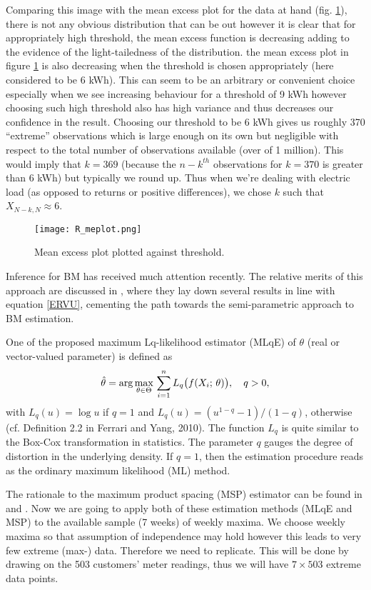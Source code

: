 Comparing this image with the mean excess plot for the data at hand (fig. \ref{fig:r_me}), there is not any obvious distribution that can be out however it is clear that for appropriately high threshold, the mean excess function is decreasing adding to the evidence of the light-tailedness of the distribution. the mean excess plot in figure \ref{fig:r_me} is also decreasing when the threshold is chosen appropriately (here considered to be 6 kWh). This can seem to be an arbitrary or convenient choice especially when we see increasing behaviour for a threshold of 9 kWh however choosing such high threshold also has high variance and thus decreases our confidence in the result. Choosing our threshold to be 6 kWh gives us roughly 370 ``extreme'' observations which is large enough on its own but negligible with respect to the total number of observations available (over of 1 million). This would imply that $k=369$ (because the $n-k^{th}$ observations for $k=370$ is greater than 6 kWh) but typically we round up. Thus when we're dealing with electric load (as opposed to returns or positive differences), we chose $k$ such that $X_{N-k,N} \approx 6$.

\begin{figure}
\centering
\texttt{[image: R\_meplot.png]}
\caption{\label{fig:r_me} Mean excess plot plotted against threshold.}
\end{figure}


Inference for BM has received much attention recently. The relative merits of this approach are discussed in \cite{FdeH:15}, where they lay down several results in line with equation \ref{ERVU}, cementing the path towards the semi-parametric approach to BM estimation.

One of the proposed maximum Lq-likelihood estimator (MLqE) of $\theta$ (real or vector-valued parameter) is defined as
\begin{equation*}
	\hat{\theta}= \displaystyle {\arg\max_{\theta \in \Theta}} \, \sum\limits_{i=1}^{n} L_q\bigl( f(X_i; \, \theta)\bigr), \quad q>0,
\end{equation*}
with $L_q(u)= \log u$ if $q=1$ and $L_q(u)= (u^{1-q}- 1)/(1-q)$, otherwise (cf. Definition 2.2 in Ferrari and Yang, 2010). The function $L_q$ is quite similar to the Box-Cox transformation in statistics. The parameter $q$ gauges the degree of distortion in the underlying density. If $q=1$, then the estimation procedure reads as the ordinary maximum likelihood (ML) method.

The rationale to the maximum product spacing (MSP) estimator can be found in \cite{ChengAmin:79} and \cite{Ranneby:84}. Now we are going to apply both of these estimation methods (MLqE and MSP) to the available sample (7 weeks) of weekly maxima. We choose weekly maxima so that assumption of independence may hold however this leads to very few extreme (max-) data. Therefore we need to replicate. This will be done by drawing on the 503 customers' meter readings, thus we will have $7 \times 503$ extreme data points.

